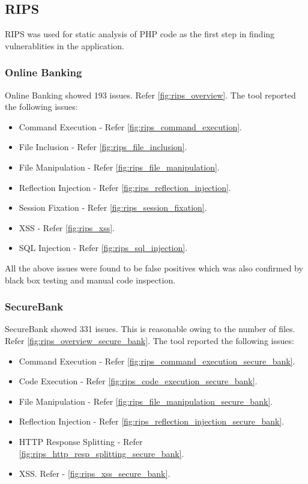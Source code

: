 \subsection{RIPS}
RIPS was used for static analysis of PHP code as the first step in finding vulnerablities in the application.
\subsubsection{Online Banking }
Online Banking showed 193 issues. Refer \ref{fig:rips_overview}. The tool reported the following issues:
\begin{itemize}
    \item Command Execution - Refer \ref{fig:rips_command_execution}.
    \item File Inclusion - Refer \ref{fig:rips_file_inclusion}.
    \item File Manipulation - Refer \ref{fig:rips_file_manipulation}.
    \item Reflection Injection - Refer \ref{fig:rips_reflection_injection}.
    \item Session Fixation - Refer \ref{fig:rips_session_fixation}.
    \item XSS - Refer \ref{fig:rips_xss}.
    \item SQL Injection - Refer \ref{fig:rips_sql_injection}.
\end{itemize}
All the above issues were found to be false positives which was also confirmed by black box testing and manual code inspection.

\subsubsection{SecureBank}
SecureBank showed 331 issues. This is reasonable owing to the number of files. Refer \ref{fig:rips_overview_secure_bank}. The tool reported the following issues:
\begin{itemize}
    \item Command Execution - Refer \ref{fig:rips_command_execution_secure_bank}.
    \item Code Execution - Refer \ref{fig:rips_code_execution_secure_bank}.
    \item File Manipulation - Refer \ref{fig:rips_file_manipulation_secure_bank}.
    \item Reflection Injection - Refer \ref{fig:rips_reflection_injection_secure_bank}.
    \item HTTP Response Splitting - Refer \ref{fig:rips_http_resp_splitting_secure_bank}.
    \item XSS. Refer - \ref{fig:rips_xss_secure_bank}.
\end{itemize}

